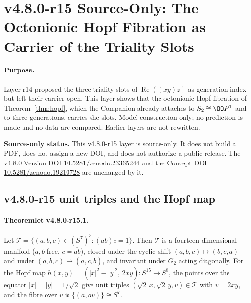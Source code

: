 
\clearpage
\section*{v4.8.0-r15 Source-Only: The Octonionic Hopf Fibration as Carrier of the Triality Slots}
\label{sec:v480-r15-hopf-triality-carrier}

\paragraph{Purpose.}
Layer r14 proposed the three triality slots of \(\operatorname{Re}((xy)z)\) as generation index but left their
carrier open.  This layer shows that the octonionic Hopf fibration of Theorem~\ref{thm:hopf}, which the Companion
already attaches to \(S_2\cong\OO P^1\) and to three generations, carries the slots.  Model construction only; no
prediction is made and no data are compared.  Earlier layers are not rewritten.

\noindent\textbf{Source-only status.}
This v4.8.0-r15 layer is source-only.  It does not build a PDF, does not assign a new DOI,
and does not authorize a public release.  The v4.8.0 Version DOI
\href{https://doi.org/10.5281/zenodo.23365244}{10.5281/zenodo.23365244} and the Concept DOI
\href{https://doi.org/10.5281/zenodo.19210728}{10.5281/zenodo.19210728} are unchanged by it.

\subsection*{v4.8.0-r15 unit triples and the Hopf map}
\label{subsec:v480-r15-triples}

\paragraph{Theoremlet v4.8.0-r15.1.}
Let \(\mathcal T=\{(a,b,c)\in(S^7)^3:(ab)c=1\}\).  Then \(\mathcal T\) is a fourteen-dimensional manifold
(\(a,b\) free, \(c=\overline{ab}\)), closed under the cyclic shift \((a,b,c)\mapsto(b,c,a)\) and under
\((a,b,c)\mapsto(\bar a,\bar c,\bar b)\), and invariant under \(G_2\) acting diagonally.  For the Hopf map
\(h(x,y)=(|x|^2-|y|^2,\,2x\bar y)\colon S^{15}\to S^8\), the points over the equator \(|x|=|y|=1/\sqrt2\) give
unit triples \((\sqrt2\,x,\sqrt2\,\bar y,\bar v)\in\mathcal T\) with \(v=2x\bar y\), and the fibre over \(v\) is
\(\{(a,\bar a v)\}\cong S^7\).

